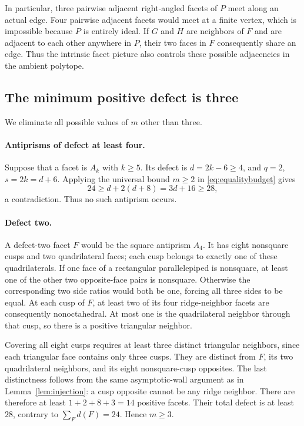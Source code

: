 \documentclass[11pt]{article}
\theoremstyle{remark}
\begin{document}
In particular, three pairwise adjacent right-angled facets of $P$
meet along an actual edge. Four pairwise adjacent facets would meet
at a finite vertex, which is impossible because $P$ is entirely
ideal. If $G$ and $H$ are neighbors of $F$ and are adjacent to each
other anywhere in $P$, their two faces in $F$ consequently share
an edge. Thus the intrinsic facet picture also controls these
possible adjacencies in the ambient polytope.

\subsection{The minimum positive defect is three}\label{first-reduction-the-minimum-positive-defect-is-three}

We eliminate all possible values of $m$ other than three.

\paragraph{Antiprisms of defect at least four.}
Suppose that a facet is $A_k$ with $k\ge5$. Its defect is
$d=2k-6\ge4$, and $q=2$, $s=2k=d+6$. Applying the universal
bound $m\ge2$ in \eqref{eq:equalitybudget} gives
\[
 24\ge d+2(d+8)=3d+16\ge28,
\]
a contradiction. Thus no such antiprism occurs.

\paragraph{Defect two.}
A defect-two facet $F$ would be the square antiprism $A_4$.
It has eight nonsquare cusps and two quadrilateral faces; each cusp
belongs to exactly one of these quadrilaterals. If one face of a
rectangular parallelepiped is nonsquare, at least one of the other two
opposite-face pairs is nonsquare. Otherwise the corresponding two
side ratios would both be one, forcing all three sides to be equal.
At each cusp of $F$, at least two of its four ridge-neighbor facets
are consequently nonoctahedral. At most one is the quadrilateral
neighbor through that cusp, so there is a positive triangular
neighbor.

Covering all eight cusps requires at least three distinct triangular
neighbors, since each triangular face contains only three cusps.
They are distinct from $F$, its two quadrilateral neighbors, and its
eight nonsquare-cusp opposites. The last distinctness follows from
the same asymptotic-wall argument as in
Lemma~\ref{lem:injection}: a cusp opposite cannot be any ridge
neighbor. There are therefore at least
$1+2+8+3=14$ positive facets. Their total defect is at least $28$,
contrary to $\sum_Fd(F)=24$. Hence $m\ge3$.
\end{document}
